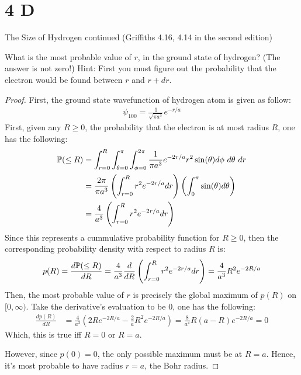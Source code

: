 \documentclass{article}
\begin{document}
\newpage

\section*{4 D}
\begin{ques}\label{q4}
The Size of Hydrogen continued (Griffiths 4.16, 4.14 in the second edition)

What is the most probable value of $r$, in the ground state of hydrogen? (The answer is not
zero!) Hint: First you must figure out the probability that the electron would be found
between $r$ and $r+dr$.
\end{ques}

\begin{proof}
    First, the ground state wavefunction of hydrogen atom is given as follow:
    \begin{align}
        \psi_{100} = \frac{1}{\sqrt{\pi a^3}}e^{-r/a}
    \end{align}
    First, given any $R\geq 0$, the probability that the electron is at most radius $R$, one has the following:
    \begin{align}
        \mathbb{P}(\leq R) &= \int_{r=0}^{R}\int_{\theta=0}^{\pi}\int_{\phi=0}^{2\pi}\frac{1}{\pi a^3}e^{-2r/a}r^2\sin(\theta)d\phi\ d\theta\ dr\\
        &= \frac{2\pi}{\pi a^3}\left(\int_{r=0}^{R}r^2e^{-2r/a}dr\right)\left(\int_{0}^{\pi}\sin(\theta)d\theta\right)\\
        &= \frac{4}{a^3}\left(\int_{r=0}^{R}r^2e^{-2r/a}dr\right)
    \end{align}
    Since this represents a cummulative probability function for $R\geq 0$, then the corresponding probability density with respect to radius $R$ is:
    \begin{align}
        p(R) = \frac{d\mathbb{P}(\leq R)}{d R} = \frac{4}{a^3}\frac{d}{dR}\left(\int_{r=0}^{R}r^2e^{-2r/a}dr\right) = \frac{4}{a^3}R^2e^{-2R/a}
    \end{align}
    Then, the most probable value of $r$ is precisely the global maximum of $p(R)$ on $[0,\infty)$. Take the derivative's evaluation to be $0$, one has the following:
    \begin{align}
        \frac{d p(R)}{dR} &= \frac{4}{a^3}\left(2Re^{-2R/a} - \frac{2}{a}R^2e^{-2R/a}\right) = \frac{8}{a^4}R\left(a-R\right)e^{-2R/a}=0
    \end{align}
    Which, this is true iff $R = 0$ or $R=a$.

    However, since $p(0) = 0$, the only possible maximum must be at $R=a$. Hence, it's most probable to have radius $r=a$, the Bohr radius.
\end{proof}
\end{document}
